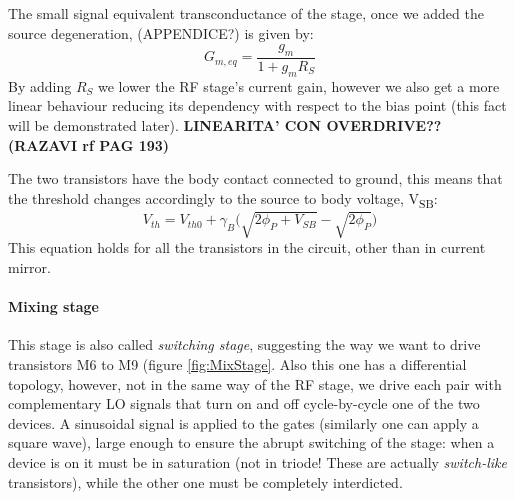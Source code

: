 The small signal equivalent transconductance of the stage, once we added the source degeneration, (APPENDICE?) is given by:
\begin{equation}
\label{eq_degenGain}
G_{m,eq} = \frac{g_m}{1+g_m R_S}
\end{equation}
By adding $R_S$ we lower the RF stage's current gain, however  we also get a more linear behaviour reducing its dependency with respect to the bias point (this fact will be demonstrated later). \textbf{LINEARITA' CON OVERDRIVE?? (RAZAVI rf PAG 193)}

The two transistors have the body contact connected to ground, this means that the threshold changes accordingly to the source to body voltage, V\textsubscript{SB}:
\begin{equation}
\label{eq_thresholdV}
V_{th} = V_{th0}+\gamma_B\big(\sqrt{2\phi_P + V_{SB}}-\sqrt{2\phi_P}\big)
\end{equation}
This equation holds for all the transistors in the circuit, other than in current mirror.

\paragraph{Mixing stage}
This stage is also called \emph{switching stage}, suggesting the way we want to drive transistors M6 to M9 (figure \ref{fig:MixStage}. Also this one has a differential topology, however, not in the same way of the RF stage, we drive each pair with complementary LO signals that turn on and off cycle-by-cycle one of the two devices. A sinusoidal signal is applied to the gates (similarly one can apply a square wave), large enough to ensure the abrupt switching of the stage: when a device is on it must be in saturation (not in  triode! These are actually \emph{switch-like} transistors), while the other one must be completely interdicted.

